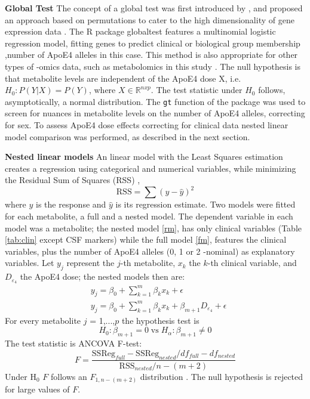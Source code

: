 \documentclass{amsart}
\begin{document}
\leavevmode\newline\textbf{Global Test}\hspace{.25cm} The concept of a global test was first introduced by \citeauthor{Simon2004DesignHealth}, and proposed an approach based on permutations to cater to the high dimensionality of gene expression data \cite{Simon2004DesignHealth}. The R package \textsf{globaltest} features a multinomial logistic regression model, fitting genes to predict clinical or biological group membership \cite{Goeman2004AOutcome, Goeman2006TestingAlternative, Goeman2023ThePackage},number of ApoE4 alleles in this case. This method is also appropriate for other types of -omics data, such as metabolomics in this study \cite{Goeman2023ThePackage}. The null hypothesis is that metabolite levels are independent of the ApoE4 dose X, i.e. $H_0 : P(Y|X) = P(Y)$, where $X \in \mathbb{R}^{n x p}$. The test statistic under $H_0$ follows, asymptotically, a normal distribution. The \texttt{gt} function of the package was used to screen for nuances in metabolite levels on the number of ApoE4 alleles, correcting for sex. To assess ApoE4 dose effects correcting for clinical data nested linear model comparison was performed, as described in the next section.

\leavevmode\newline \textbf{Nested linear models}\hspace{.25cm}
An linear model with the Least Squares estimation creates a regression using categorical and numerical variables, while minimizing the Residual Sum of Squares (RSS) \cite{ott2015introduction}, 
$$\mathrm{RSS} = \sum (y - \hat{y})^2$$ where $y$ is the response and $\hat{y}$ is its regression estimate. Two models were fitted for each metabolite, a full and a nested model. The dependent variable in each model was a metabolite; the nested model \eqref{rm}, has only clinical variables (Table \ref{tab:clin} except CSF markers) while the full model \eqref{fm}, features the clinical variables, plus the number of ApoE4 alleles (0, 1 or 2 -nominal) as explanatory variables. Let $y_j$ represent the $j$-th metabolite, $x_k$ the $k$-th clinical variable, and $D_{\varepsilon_4}$ the ApoE4 dose; the nested models then are:
\begin{align}
    & y_j = \beta_0 + \sum_{k=1}^m\beta_kx_k +\epsilon \label{rm} \\
    & y_j = \beta_0 + \sum_{k=1}^m\beta_kx_k + \beta_{m+1}D_{\varepsilon_4} + \epsilon \label{fm}
\end{align}
For every metabolite $j$ = 1,...,$p$ the hypothesis test is 
\[H_0: \beta_{m+1} = 0 \; \mathrm{vs} \; H_\alpha: \beta_{m+1} \neq 0\]
The test statistic is ANCOVA F-test:
\[ F = \frac{\mathrm{SSReg}_{full}-\mathrm{SSReg}_{nested}/df_{full}-df_{nested}}{\mathrm{RSS}_{nested}/n-(m+2)}\]
Under H$_0$ $F$ follows an $F_{1, n-(m+2)}$ distribution \cite{ott2015introduction}. The null hypothesis is rejected for large values of $F$.
\end{document}
